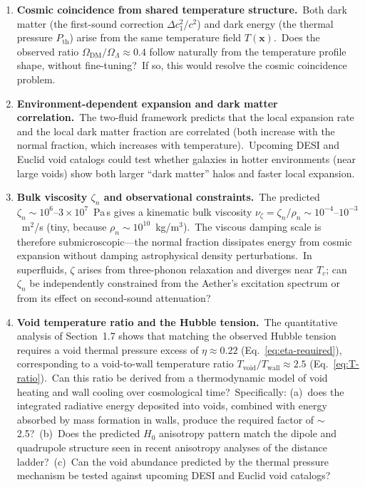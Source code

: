 ﻿\documentclass[12pt,letterpaper]{article}
\begin{document}
\begin{enumerate}[leftmargin=2em]
  \item \textbf{Cosmic coincidence from shared temperature structure.}\
    Both dark matter (the first-sound correction $\Delta c_1^2/c^2$)
    and dark energy (the thermal pressure $P_{\mathrm{th}}$) arise from
    the same temperature field $T(\mathbf{x})$.\ Does the observed ratio
    $\Omega_{\mathrm{DM}}/\Omega_\Lambda \approx 0.4$ follow naturally
    from the temperature profile shape, without fine-tuning?\ If so, this
    would resolve the cosmic coincidence problem.

  \item \textbf{Environment-dependent expansion and dark matter
    correlation.}\ The two-fluid framework predicts that the local
    expansion rate and the local dark matter fraction are correlated
    (both increase with the normal fraction, which increases with
    temperature).\ Upcoming DESI and Euclid void catalogs could test
    whether galaxies in hotter environments (near large voids) show both
    larger ``dark matter'' halos and faster local expansion.

  \item \textbf{Bulk viscosity $\zeta_n$ and observational
    constraints.}\ The predicted $\zeta_n \sim 10^6$--$3 \times 10^7$~Pa\,s
    gives a kinematic bulk viscosity
    $\nu_\zeta = \zeta_n/\rho_n \sim 10^{-4}$--$10^{-3}$~m$^2$/s
    (tiny, because $\rho_n \sim 10^{10}$~kg/m$^3$).\ The viscous damping
    scale is therefore submicroscopic---the normal fraction dissipates
    energy from cosmic expansion without damping astrophysical density
    perturbations.\ In superfluids, $\zeta$ arises from three-phonon
    relaxation and diverges near $T_c$; can $\zeta_n$ be independently
    constrained from the Aether's excitation spectrum or from its effect
    on second-sound attenuation?

  \item \textbf{Void temperature ratio and the Hubble tension.}\
    The quantitative analysis of Section~1.7 shows that matching the
    observed Hubble tension requires a void thermal pressure excess of
    $\eta \approx 0.22$ (Eq.~\ref{eq:eta-required}), corresponding to a
    void-to-wall temperature ratio $T_{\mathrm{void}}/T_{\mathrm{wall}}
    \approx 2.5$ (Eq.~\ref{eq:T-ratio}).\ Can this ratio be derived from a
    thermodynamic model of void heating and wall cooling over cosmological
    time?\ Specifically: (a)~does the integrated radiative energy deposited
    into voids, combined with energy absorbed by mass formation in walls,
    produce the required factor of $\sim$2.5?\ (b)~Does the predicted
    $H_0$ anisotropy pattern match the dipole and quadrupole structure seen
    in recent anisotropy analyses of the distance ladder?\ (c)~Can the void
    abundance predicted by the thermal pressure mechanism be tested against
    upcoming DESI and Euclid void catalogs?


\end{enumerate}
\end{document}
